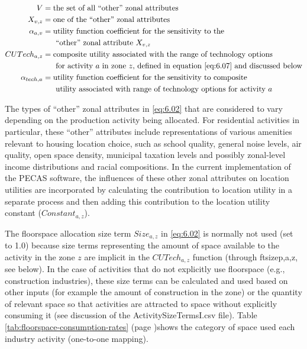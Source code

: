 \begin{align*}
V &= \text{the set of all ``other'' zonal attributes} \\
X_{v,z} &= \text{one of the ``other'' zonal attributes} \\
\alpha_{a,v} &= \text{utility function coefficient for the sensitivity to the} \\
 &~~~~~\text{``other'' zonal attribute} ~X_{v,z} \\
CUTech_{a,z} &= \text{composite utility associated with the range of technology options} \\
 &~~~~~\text{for activity $a$ in zone $z$, defined in equation \ref{eq:6.07} and discussed below} \\
\alpha_{tech,a} &= \text{utility function coefficient for the sensitivity to composite} \\
 &~~~~~\text{utility associated with range of technology options for activity $a$}
\end{align*}

The types of ``other'' zonal attributes in \ref{eq:6.02} that are considered to vary depending on the production activity being allocated. For residential activities in particular, these ``other'' attributes include representations of various amenities relevant to housing location choice, such as school quality, general noise levels, air quality, open space density, municipal taxation levels and possibly zonal-level income distributions and racial compositions.  In the current implementation of the PECAS software, the influences of these other zonal attributes on location utilities are incorporated by calculating the contribution to location utility in a separate process and then adding this contribution to the location utility constant ($Constant_{a,z}$).

The floorspace allocation size term $Size_{a,z}$ in \ref{eq:6.02} is normally not used (set to 1.0) because size terms representing the amount of space available to the activity in the zone $z$ are implicit in the $CUTech_{a,z}$ function (through ftsizep,a,z, see below). In the case of activities that do not explicitly use floorspace (e.g., construction industries), these size terms can be calculated and used based on other inputs (for example the amount of construction in the zone) or the quantity of relevant space so that activities are attracted to space without explicitly consuming it (see discussion of the ActivitySizeTermsI.csv file). Table \ref{tab:floorspace-consumption-rates} (page \pageref{tab:floorspace-consumption-rates})shows the category of space used each industry activity (one-to-one mapping).


